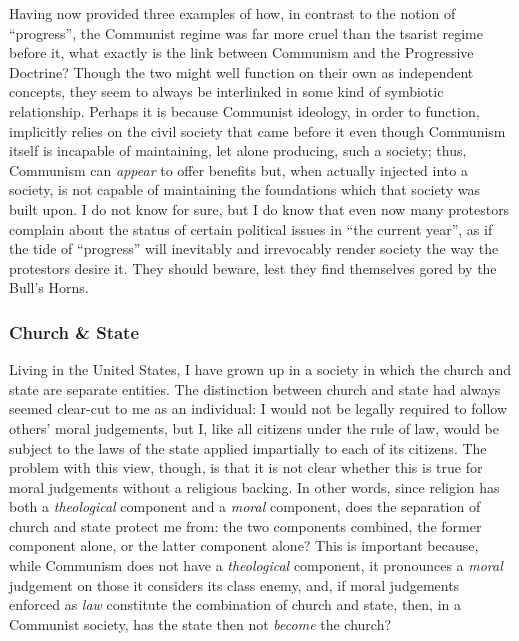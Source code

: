 \documentclass{article}
\begin{document}
Having now provided three examples of how, in contrast to the notion of ``progress'', the Communist regime was far more cruel than the tsarist regime before it, what exactly is the link between Communism and the Progressive Doctrine?  Though the two might well function on their own as independent concepts, they seem to always be interlinked in some kind of symbiotic relationship.  Perhaps it is because Communist ideology, in order to function, implicitly relies on the civil society that came before it even though Communism itself is incapable of maintaining, let alone producing, such a society; thus, Communism can \emph{appear} to offer benefits but, when actually injected into a society, is not capable of maintaining the foundations which that society was built upon.  I do not know for sure, but I do know that even now many protestors complain about the status of certain political issues in ``the current year'', as if the tide of ``progress'' will inevitably and irrevocably render society the way the protestors desire it.  They should beware, lest they find themselves gored by the Bull's Horns.

\subsubsection{Church \& State}
Living in the United States, I have grown up in a society in which the church and state are separate entities.  The distinction between church and state had always seemed clear-cut to me as an individual: I would not be legally required to follow others' moral judgements, but I, like all citizens under the rule of law, would be subject to the laws of the state applied impartially to each of its citizens.  The problem with this view, though, is that it is not clear whether this is true for moral judgements without a religious backing.  In other words, since religion has both a \emph{theological} component and a \emph{moral} component, does the separation of church and state protect me from: the two components combined, the former component alone, or the latter component alone?  This is important because, while Communism does not have a \emph{theological} component, it pronounces a \emph{moral} judgement on those it considers its class enemy, and, if moral judgements enforced as \emph{law} constitute the combination of church and state, then, in a Communist society, has the state then not \emph{become} the church?
\end{document}
